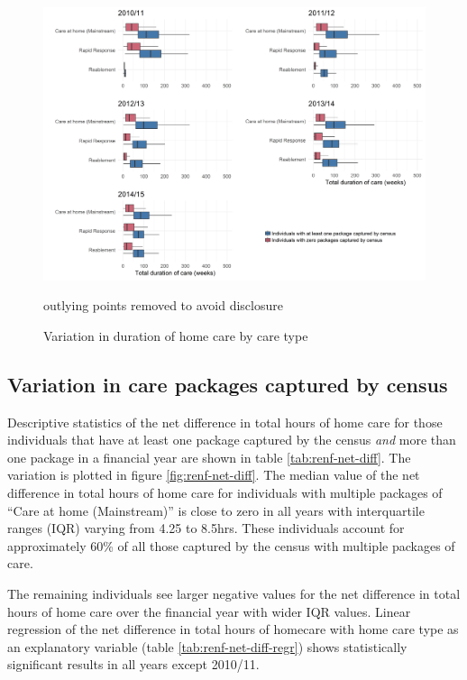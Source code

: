\documentclass[]{article}
\begin{document}
\begin{figure}[]
  \centering
    \includegraphics{figures/chapter-renf/19-dur-type-plot.png}
    \caption{Variation in duration of home care by care type}
    {\scriptsize outlying points removed to avoid disclosure}
    \label{fig:renf-dur-type}
\end{figure}

\FloatBarrier
\subsection{Variation in care packages captured by census}\label{subsec:renf-census-variation}

Descriptive statistics of the net difference in total hours of home care
for those individuals that have at least one package captured by the
census \emph{and} more than one package in a financial year are shown in
table \ref{tab:renf-net-diff}. The variation is plotted in figure
\ref{fig:renf-net-diff}. The median value of the net difference in total
hours of home care for individuals with multiple packages of ``Care at
home (Mainstream)'' is close to zero in all years with interquartile
ranges (IQR) varying from 4.25 to 8.5hrs. These individuals account for
approximately 60\% of all those captured by the census with multiple
packages of care.

The remaining individuals see larger negative values for the net
difference in total hours of home care over the financial year with
wider IQR values. Linear regression of the net difference in total hours
of homecare with home care type as an explanatory variable (table
\ref{tab:renf-net-diff-regr}) shows statistically significant results in
all years except 2010/11.
\end{document}

